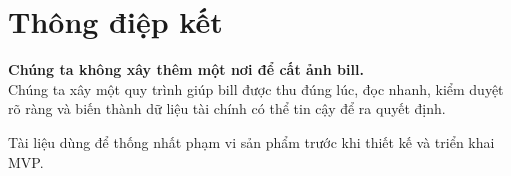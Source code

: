 \documentclass[a4paper,11pt]{article}
\begin{document}
\section{Thông điệp kết}

\vspace{0.8cm}
\begin{keybox}
\centering
{\sffamily\Large\bfseries\color{PrimaryDark}
Chúng ta không xây thêm một nơi để cất ảnh bill.}\\[0.4cm]
{\sffamily\large
Chúng ta xây một quy trình giúp bill được thu đúng lúc, đọc nhanh, kiểm duyệt rõ ràng và biến thành dữ liệu tài chính có thể tin cậy để ra quyết định.}
\end{keybox}

\vfill
\begin{center}
\sffamily\color{Muted}
Tài liệu dùng để thống nhất phạm vi sản phẩm trước khi thiết kế và triển khai MVP.
\end{center}
\end{document}
